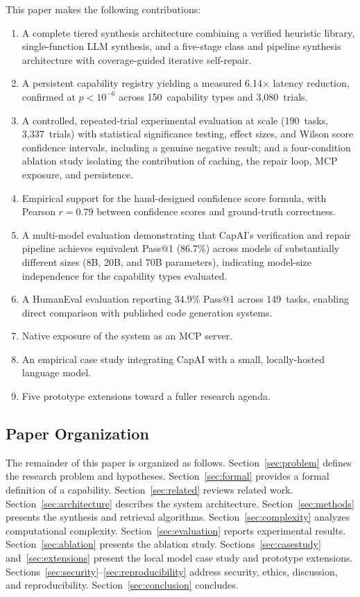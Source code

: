 \documentclass[conference]{IEEEtran}
\begin{document}
This paper makes the following contributions:
\begin{enumerate}
  \item A complete tiered synthesis architecture combining a verified
        heuristic library, single-function LLM synthesis, and a five-stage
        class and pipeline synthesis architecture with coverage-guided
        iterative self-repair.
  \item A persistent capability registry yielding a measured 6.14$\times$
        latency reduction, confirmed at $p < 10^{-6}$ across 150~capability
        types and 3{,}080~trials.
  \item A controlled, repeated-trial experimental evaluation at scale
        (190~tasks, 3{,}337~trials) with statistical significance testing,
        effect sizes, and Wilson score confidence intervals, including a
        genuine negative result; and a four-condition ablation study
        isolating the contribution of caching, the repair loop, MCP
        exposure, and persistence.
  \item Empirical support for the hand-designed confidence score formula,
        with Pearson $r = 0.79$ between confidence scores and
        ground-truth correctness.
  \item A multi-model evaluation demonstrating that CapAI's verification
        and repair pipeline achieves equivalent Pass@1 (86.7\%) across
        models of substantially different sizes (8B, 20B, and 70B
        parameters), indicating model-size independence for the capability
        types evaluated.
  \item A HumanEval evaluation reporting 34.9\% Pass@1 across 149~tasks,
        enabling direct comparison with published code generation systems.
  \item Native exposure of the system as an MCP server.
  \item An empirical case study integrating CapAI with a small,
        locally-hosted language model.
  \item Five prototype extensions toward a fuller research agenda.
\end{enumerate}

\subsection{Paper Organization}

The remainder of this paper is organized as follows.
Section~\ref{sec:problem} defines the research problem and hypotheses.
Section~\ref{sec:formal} provides a formal definition of a capability.
Section~\ref{sec:related} reviews related work.
Section~\ref{sec:architecture} describes the system architecture.
Section~\ref{sec:methods} presents the synthesis and retrieval algorithms.
Section~\ref{sec:complexity} analyzes computational complexity.
Section~\ref{sec:evaluation} reports experimental results.
Section~\ref{sec:ablation} presents the ablation study.
Sections~\ref{sec:casestudy} and~\ref{sec:extensions} present the local
model case study and prototype extensions.
Sections~\ref{sec:security}--\ref{sec:reproducibility} address security,
ethics, discussion, and reproducibility.
Section~\ref{sec:conclusion} concludes.
\end{document}
